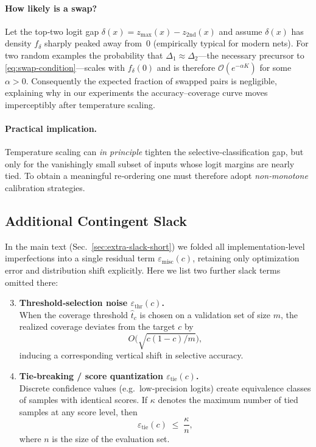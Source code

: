\paragraph{How likely is a swap?}
Let the top‑two logit gap
\(
\delta(x)=z_{\max}(x)-z_{2\text{nd}}(x)
\)
and assume \(\delta(x)\) has density \(f_\delta\) sharply peaked away
from~\(0\) (empirically typical for modern nets).  For two random
examples the probability that \(\Delta_1\approx\Delta_2\)---the
necessary precursor to \eqref{eq:swap-condition}---scales with
\(f_\delta(0)\) and is therefore \(\mathcal{O}(e^{-\alpha K})\) for
some \(\alpha>0\).  Consequently the expected fraction of swapped pairs
is negligible, explaining why in our experiments the
accuracy--coverage curve moves imperceptibly after temperature scaling.

\paragraph{Practical implication.}
Temperature scaling can \emph{in principle} tighten the
selective‑classification gap, but only for the vanishingly small subset
of inputs whose logit margins are nearly tied.  To obtain a meaningful
re‑ordering one must therefore adopt \emph{non‑monotone} calibration strategies.%


\subsection{Additional Contingent Slack}
\label{app:extra-slack-omitted}

In the main text (Sec.~\ref{sec:extra-slack-short}) we folded all implementation‐level imperfections into a single residual term \(\varepsilon_{\text{misc}}(c)\), retaining only optimization error and distribution shift explicitly. Here we list two further slack terms omitted there:

\begin{enumerate}[leftmargin=1.2em]
  \setcounter{enumi}{2}
  \item \textbf{Threshold‐selection noise \(\varepsilon_{\text{thr}}(c)\).}\\
    When the coverage threshold \(\hat t_c\) is chosen on a validation set of size \(m\), the realized coverage deviates from the target \(c\) by 
    \begin{equation}
      O\bigl(\sqrt{c(1-c)/m}\bigr),
    \end{equation}
    inducing a corresponding vertical shift in selective accuracy.

  \item \textbf{Tie‐breaking / score quantization \(\varepsilon_{\text{tie}}(c)\).}\\
    Discrete confidence values (e.g.\ low‐precision logits) create equivalence classes of samples with identical scores.  If \(\kappa\) denotes the maximum number of tied samples at any score level, then
    \begin{equation}
      \varepsilon_{\text{tie}}(c)
      \;\le\;
      \frac{\kappa}{n},
    \end{equation}
    where \(n\) is the size of the evaluation set.
\end{enumerate}

